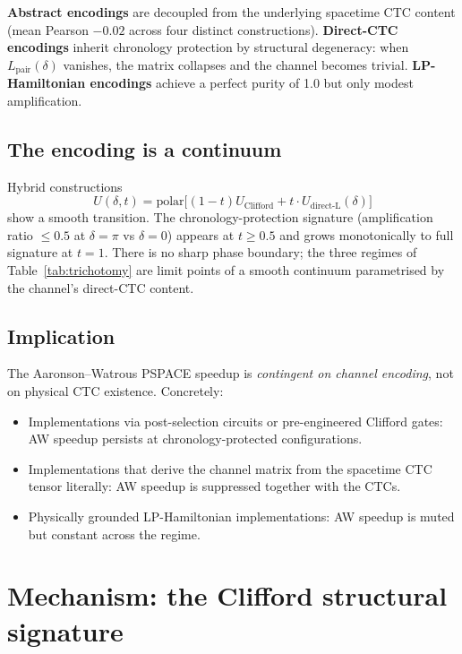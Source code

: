 \documentclass[11pt,a4paper]{article}
\begin{document}
\textbf{Abstract encodings} are decoupled from the underlying
spacetime CTC content (mean Pearson $-0.02$ across four distinct
constructions). \textbf{Direct-CTC encodings} inherit chronology
protection by structural degeneracy: when $L_{\text{pair}}(\delta)$
vanishes, the matrix collapses and the channel becomes trivial.
\textbf{LP-Hamiltonian encodings} achieve a perfect purity of 1.0
but only modest amplification.

\subsection{The encoding is a continuum}

Hybrid constructions
\begin{equation}
U(\delta, t) = \mathrm{polar}\!\big[ (1-t) U_{\text{Clifford}} + t \cdot U_{\text{direct-L}}(\delta) \big]
\end{equation}
show a smooth transition. The chronology-protection signature
(amplification ratio $\le 0.5$ at $\delta = \pi$ vs $\delta = 0$)
appears at $t \ge 0.5$ and grows monotonically to full signature at
$t = 1$. There is no sharp phase boundary; the three regimes of
Table~\ref{tab:trichotomy} are limit points of a smooth continuum
parametrised by the channel's direct-CTC content.

\subsection{Implication}

The Aaronson--Watrous PSPACE speedup is \emph{contingent on channel
encoding}, not on physical CTC existence. Concretely:
\begin{itemize}
\item Implementations via post-selection circuits or pre-engineered
Clifford gates: AW speedup persists at chronology-protected
configurations.
\item Implementations that derive the channel matrix from the
spacetime CTC tensor literally: AW speedup is suppressed together
with the CTCs.
\item Physically grounded LP-Hamiltonian implementations: AW
speedup is muted but constant across the regime.
\end{itemize}

\section{Mechanism: the Clifford structural signature}
\end{document}
